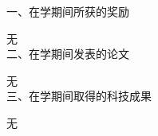 ﻿\begin{achievement}
一、在学期间所获的奖励 \par %
无\\
二、在学期间发表的论文 \par %
无\\
三、在学期间取得的科技成果 \par %
无\\
\end{achievement}
